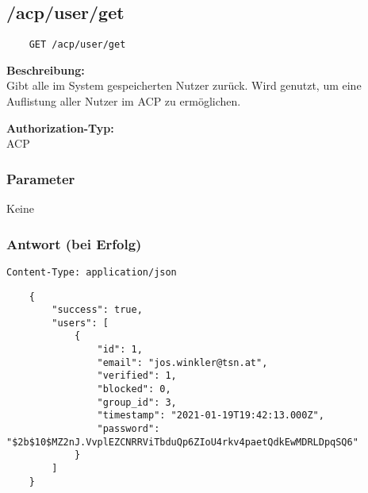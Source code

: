 \subsection{/acp/user/get}

\begin{lstlisting}
    GET /acp/user/get
\end{lstlisting}

\textbf{Beschreibung:} \\
Gibt alle im System gespeicherten Nutzer zurück. Wird genutzt, um eine Auflistung aller Nutzer im ACP zu ermöglichen.

\textbf{Authorization-Typ:} \\
ACP

\subsubsection{Parameter}

Keine

\subsubsection{Antwort (bei Erfolg)}

\lstinline{Content-Type: application/json}
\begin{lstlisting}
    {
        "success": true, 
        "users": [
            {
                "id": 1,
                "email": "jos.winkler@tsn.at",
                "verified": 1,
                "blocked": 0,
                "group_id": 3,
                "timestamp": "2021-01-19T19:42:13.000Z",
                "password": "$2b$10$MZ2nJ.VvplEZCNRRViTbduQp6ZIoU4rkv4paetQdkEwMDRLDpqSQ6"
            }
        ]
    }
\end{lstlisting}
